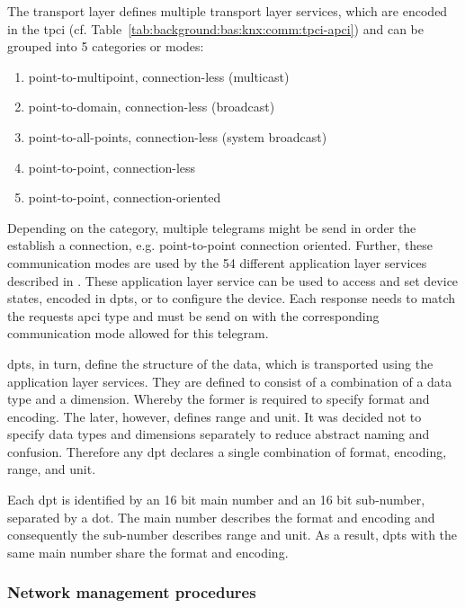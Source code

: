 The transport layer defines multiple transport layer services, which are encoded in the \gls{tpci} (cf. Table~\ref{tab:background:bas:knx:comm:tpci-apci}) and can be grouped into 5 categories or modes: 

\begin{enumerate}
	\item point-to-multipoint, connection-less (multicast)
	\item point-to-domain, connection-less (broadcast)
	\item point-to-all-points, connection-less (system broadcast)
	\item point-to-point, connection-less
	\item point-to-point, connection-oriented
\end{enumerate}
\parencite[cf.][p.~30]{DIN_EN_50090-4-2}

Depending on the category, multiple telegrams might be send in order the establish a connection, e.g. point-to-point connection oriented.
Further, these communication modes are used by the 54 different application layer services described in \textcite{DIN_EN_50090-4-1}.
These application layer service can be used to access and set device states, encoded in \glspl{dpt}, or to configure the device.
Each response needs to match the requests \gls{apci} type and must be send on with the corresponding communication mode allowed for this telegram. \parencite[][p.~9--10]{DIN_EN_50090-4-1}

\glspl{dpt}, in turn, define the structure of the data, which is transported using the application layer services.
They are defined to consist of a combination of a data type and a dimension. Whereby the former is required to specify format and encoding. The later, however, defines range and unit.
It was decided not to specify data types and dimensions separately to reduce abstract naming and confusion.
Therefore any \gls{dpt} declares a single combination of format, encoding, range, and unit. \parencite[p.~38]{DIN_EN_50090-3-3}

Each \gls{dpt} is identified by an 16 bit main number and an 16 bit sub-number, separated by a dot. The main number describes the format and encoding and consequently the sub-number describes range and unit. As a result, \glspl{dpt} with the same main number share the format and encoding.


	
\subsubsection{Network management procedures}


